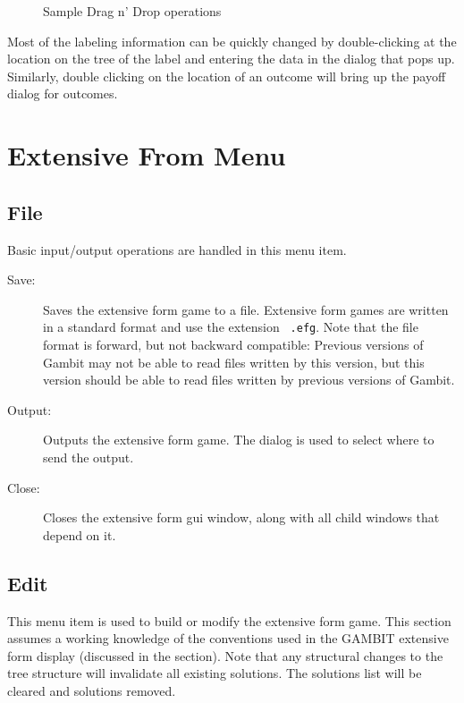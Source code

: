 \begin{figure}
\caption{Sample Drag n' Drop operations}
\end{figure}

Most of the labeling information can be quickly changed by
double-clicking at the location on the tree of the label and entering
the data in the dialog that pops up.  Similarly, double clicking on
the location of an outcome will bring up the payoff dialog for
outcomes.

\section{Extensive From Menu}

\subsection{File}\label{effile}

Basic input/output operations are handled in this menu item.  

\begin{description}
\item[Save:] Saves the extensive form game to a file.  Extensive form
games are written in a standard format and use the extension {\tt 
.efg}. Note that the file format is forward, but not backward compatible:
Previous versions of Gambit may not be able to read files written by
this version, but this version should be able to read files written by
previous versions of Gambit.
\item[Output:] Outputs the extensive form game.  The  dialog is used to select where to send the output.
\item[Close:] Closes the extensive form gui window, along with all
child windows that depend on it.
\end{description}

\subsection{Edit}\label{efedit}
This menu item is used to build or modify the extensive form game.
This section assumes a working knowledge of the conventions used in
the GAMBIT extensive form display (discussed in the  section).  Note that any structural changes to the
tree structure will invalidate all existing solutions.  The solutions
list will be cleared and solutions removed.

